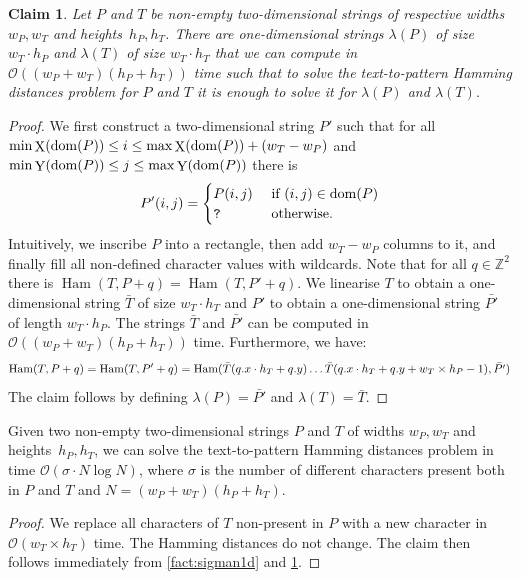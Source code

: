 \documentclass[twoside,leqno]{article}
\newtheorem{claim}{Claim}[section]
\newcommand{\Z}{\mathbb{Z}}
\renewcommand{\O}{\mathcal{O}}
\DeclareMathOperator*{\X}{X}
\DeclareMathOperator*{\Y}{Y}
\DeclareMathOperator*{\Ham}{Ham}
\begin{document}
\begin{claim}
\label{claim:padding}
Let $P$ and $T$ be non-empty two-dimensional strings of respective widths $w_P, w_T$ and heights~$h_P, h_T$. There are one-dimensional strings $\lambda(P)$ of size $w_T \cdot h_P$ and $\lambda(T)$ of size $w_T \cdot h_T$ that we can compute in $\O((w_P+w_T)(h_P+h_T))$ time such that to solve the text-to-pattern Hamming distances problem for $P$ and $T$ it is enough to solve it for $\lambda(P)$ and $\lambda(T)$. 
\end{claim}
\begin{proof}
We first construct a two-dimensional string $P'$ such that for all $\min \X(\d{P}) \le i \le \max \X(\d{P})+(w_T-w_P)$ and $\min \Y(\d{P}) \le j \le \max \Y(\d{P})$ there is
%
$$
P'(i,j) = 
\begin{cases}
P(i,j) & \text{ if } (i,j) \in \operatorname*{dom}(P)\\
\texttt{?} & \text{ otherwise.}
\end{cases}
$$
%
Intuitively, we inscribe $P$ into a rectangle, then add $w_T-w_P$ columns to it, and finally fill all non-defined character values with wildcards. Note that for all $q \in \Z^2$ there is $\Ham(T,P+q) = \Ham(T,P'+q)$. We linearise $T$ to obtain a one-dimensional string $\bar{T}$ of size $w_T \cdot h_T$ and $P'$ to obtain a one-dimensional string $\bar{P'}$ of length $w_T \cdot h_P$. The strings $\bar{T}$ and $\bar{P'}$ can be computed in $\O((w_P+w_T)(h_P+h_T))$ time. Furthermore, we have:
%
$$\Ham(T, P+q) = \Ham(T,P'+q) = \Ham(\bar{T}(\x{q} \cdot h_T + \y{q}) \ldots \bar{T}(\x{q} \cdot h_T + \y{q}+w_T \times h_P-1), \bar{P'})$$
%
The claim follows by defining $\lambda(P) = \bar{P'}$ and $\lambda(T) = \bar{T}$.  
\end{proof}

\begin{corollary}\label{cor:sigman2d}
Given two non-empty two-dimensional strings $P$ and $T$ of widths $w_P, w_T$ and heights~$h_P, h_T$, we can solve the text-to-pattern Hamming distances problem in time $\O(\sigma \cdot N \log N)$, where $\sigma$ is the number of different characters present both in $P$ and $T$ and $N = (w_P + w_T)(h_P + h_T)$.
\end{corollary}
\begin{proof}
We replace all characters of $T$ non-present in $P$ with a new character in $\O(w_T\times h_T)$ time. The Hamming distances do not change. The claim then follows immediately from \cref{fact:sigman1d} and \cref{claim:padding}. 
\end{proof}
\end{document}
